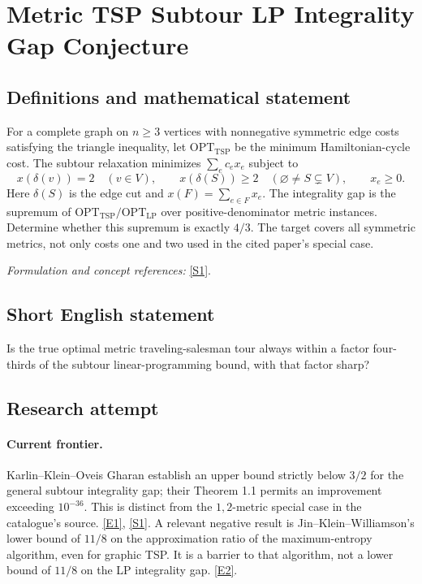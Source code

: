 \documentclass[11pt,a4paper]{article}
\newcommand{\sref}[2]{\hyperlink{source:#1:#2}{[S#2]}}
\newcommand{\eref}[2]{\hyperlink{extra:#1:#2}{[E#2]}}
\newif\ifshowcatalogue
\newcommand{\cataloguescope}[1]{\ifshowcatalogue
 \paragraph{Exact scope in the supplied catalogue.}
 \begin{quote}\small #1\end{quote}\fi}
\numberwithin{equation}{section}
\begin{document}
\setcounter{section}{0}
\clearpage
\section*{\texorpdfstring{Metric TSP Subtour LP Integrality Gap Conjecture}{Metric TSP Subtour LP Integrality Gap Conjecture}}\label{30006787}
\subsection{Definitions and mathematical statement}
For a complete graph on $n\ge3$ vertices with nonnegative symmetric edge costs satisfying the triangle inequality, let $\mathrm{OPT}_{\mathrm{TSP}}$ be the minimum Hamiltonian-cycle cost. The subtour relaxation minimizes $\sum_e c_ex_e$ subject to
\[
 x(\delta(v))=2\quad(v\in V),\qquad
 x(\delta(S))\ge2\quad(\varnothing\ne S\subsetneq V),\qquad x_e\ge0.
\]
Here $\delta(S)$ is the edge cut and $x(F)=\sum_{e\in F}x_e$. The integrality gap is the supremum of
$\mathrm{OPT}_{\mathrm{TSP}}/\mathrm{OPT}_{\mathrm{LP}}$ over positive-denominator metric instances. Determine whether this supremum is exactly $4/3$. The target covers all symmetric metrics, not only costs one and two used in the cited paper's special case.
\par\smallskip\textit{Formulation and concept references:} \sref{30006787}{1}.
\cataloguescope{Prove or disprove that the integrality gap of the subtour (Held-Karp) LP relaxation of the symmetric metric traveling salesman problem equals 4/3.}
\subsection{Short English statement}
Is the true optimal metric traveling-salesman tour always within a factor four-thirds of the subtour linear-programming bound, with that factor sharp?
\subsection{Research attempt}

\paragraph{Current frontier.}
Karlin--Klein--Oveis Gharan establish an upper bound strictly below
$3/2$ for the general subtour integrality gap; their Theorem 1.1 permits
an improvement exceeding $10^{-36}$. This is distinct from the
$1,2$-metric special case in the catalogue's source. \eref{30006787}{1},
\sref{30006787}{1}.
A relevant negative result is Jin--Klein--Williamson's lower bound of
$11/8$ on the approximation ratio of the maximum-entropy algorithm,
even for graphic TSP. It is a barrier to that algorithm, not a lower
bound of $11/8$ on the LP integrality gap. \eref{30006787}{2}.
\end{document}
